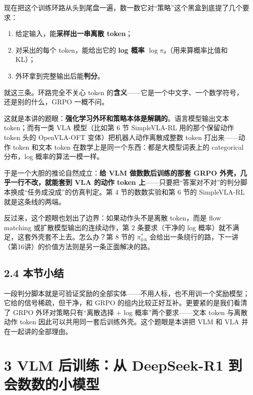 \documentclass[
  chinese,
]{ctexart}
\providecommand{\tightlist}{%
  \setlength{\itemsep}{0pt}\setlength{\parskip}{0pt}}
\begin{document}
现在把这个训练环路从头到尾盘一遍，数一数它对``策略''这个黑盒到底提了几个要求：

\begin{enumerate}
\def\labelenumi{\arabic{enumi}.}
\tightlist
\item
  给定输入，能\textbf{采样出一串离散 token}；
\item
  对采出的每个 token，能给出它的 \textbf{log 概率
  \(\log \pi_\theta\)}（用来算概率比值和 KL）；
\item
  外环拿到完整输出后能\textbf{判分}。
\end{enumerate}

就这三条。环路完全不关心 token
的\textbf{含义}------它是一个中文字、一个数学符号，还是别的什么，GRPO
一概不问。

这就是本讲的题眼：\textbf{强化学习外环和策略本体是解耦的}。语言模型输出文本
token；而有一类 VLA 模型（比如第 6 节 SimpleVLA-RL 用的那个保留动作
token 头的 OpenVLA-OFT 变体）把机器人动作离散成整数 token
打出来------动作 token 和文本 token
在数学上是同一个东西：都是大模型词表上的 categorical 分布，log
概率的算法一模一样。

于是一个大胆的推论自然成立：\textbf{给 VLM 做数数后训练的那套 GRPO
外壳，几乎一行不改，就能套到 VLA 的动作 token
上}------只要把``答案对不对''的判分脚本换成``任务成没成''的仿真判定。第
4 节的数数实验和第 6 节的 SimpleVLA-RL 就是这条线的两端。

反过来，这个题眼也划出了边界：如果动作头不是离散 token，而是 flow
matching 或扩散模型输出的连续动作，第 2 条要求（干净的 log
概率）就不满足，这套外壳套不上去。怎么办？第 8 节的 \(\pi^{*}_{0.6}\)
会给出一条绕行的路，下一讲（第16讲）的价值方法则是另一条正面解决的路。

\subsection{2.4 本节小结}\label{ux672cux8282ux5c0fux7ed3-1}

一段判分脚本就是可验证奖励的全部实体------不用人标，也不用训一个奖励模型；它给的信号稀疏，但干净，和
GRPO 的组内比较正好互补。更要紧的是我们看清了 GRPO
外环对策略只有``离散选择 + log 概率''两个要求------文本 token 与离散动作
token 因此可以共用同一套后训练外壳。这个题眼是本讲把 VLM 和 VLA
并在一起讲的全部理由。

\section{3 VLM 后训练：从 DeepSeek-R1
到会数数的小模型}\label{vlm-ux540eux8badux7ec3ux4ece-deepseek-r1-ux5230ux4f1aux6570ux6570ux7684ux5c0fux6a21ux578b}
\end{document}
